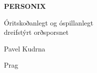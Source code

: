 \thispagestyle{empty}
\begin{center}
  {\sffamily\bfseries\fontsize{34}{40}\selectfont PERSONIX\par}
  \vspace{2.2em}
  {\rmfamily\large Óritskoðanlegt og óspillanlegt\\[0.25em]
   dreifstýrt orðsporsnet\par}
\end{center}
\begin{center}
  {\rmfamily\Large Pavel Kudrna\par}
  \vspace{0.45em}
  {\rmfamily\small Prag\quad\textbullet{}\par}
\end{center}
\clearpage
